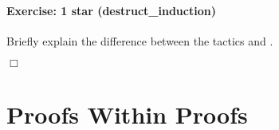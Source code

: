 \documentclass[12pt]{report}
\begin{document}
\paragraph{Exercise: 1 star (destruct\_induction)}

 Briefly explain the difference between the tactics
     and .  




 \ensuremath{\Box} \begin{coqdoccode}
\coqdocemptyline
\end{coqdoccode}
\section{Proofs Within Proofs}
\end{document}
